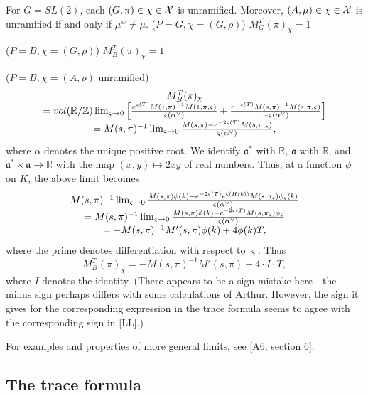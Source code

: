 \begin{example} For $G=SL(2)$, each $(G,\pi)\in\chi\in{\cal{X}}$ is
unramified. Moreover, $(A,\mu)\in\chi\in{\cal{X}}$ is unramified
if and only if $\mu^w\not=\mu$.
($P=G,\chi =(G,\rho )$) $M_G^T(\pi )_\chi =1$

($P=B,\chi =(G,\rho )$) $M_B^T(\pi )_\chi =1$

($P=B,\chi =(A,\rho )$ unramified) 
\[
\begin{array}{c}
M_B^T(\pi )_\chi \\
=vol({\mathbb{R}}/{\mathbb{Z}})
\lim_{\varsigma \rightarrow 0}
\left[
\frac{e^{\varsigma (T)}
M(1,\pi )^{-1}M(1,\pi ,\varsigma )}{\varsigma (\alpha^{\vee })}
+\frac{e^{-\varsigma (T)}
M(s,\pi )^{-1}M(s,\pi ,\varsigma )}{-\varsigma (\alpha^{\vee })}
\right]\\
=M(s,\pi)^{-1}
\lim_{\varsigma \rightarrow 0}
{M(s,\pi)-e^{-2\varsigma (T)}M(s,\pi,\varsigma)
\over \varsigma(\alpha^\vee)} ,
\end{array}
\]
where $\alpha $ denotes the unique positive root.
We identify ${\mathfrak{a}}^*$ with ${\mathbb{R}}$, ${\mathfrak{a}}$ with
${\mathbb{R}}$, and
${\mathfrak{a}}^*\times {\mathfrak{a}}\rightarrow {\mathbb{R}}$ with
the map $(x,y)\longmapsto 2xy$
of real numbers. Thus, at a function $\phi$
on $K$, the above limit becomes 
\[
\begin{array}{c}
M(s,\pi)^{-1}
\lim_{\varsigma \rightarrow 0}
{M(s,\pi)\phi(k)-e^{-2\varsigma (T)}e^{\varsigma (H(k))}
M(s,\pi_\varsigma)\phi_\varsigma(k)
\over \varsigma(\alpha^\vee)} \\
=M(s,\pi)^{-1}
\lim_{\varsigma \rightarrow 0}
{M(s,\pi)\phi(k)-e^{-2\varsigma (T)}M(s,\pi_\varsigma)\phi_\varsigma
\over \varsigma(\alpha^\vee)} \\
=-M(s,\pi)^{-1}M'(s,\pi)\phi(k)+4 \phi(k) T,
\end{array}
\]
where the prime denotes differentiation with respect to
$\varsigma$. Thus
\[
M_B^T(\pi )_\chi =
-M(s,\pi)^{-1}M'(s,\pi)+4\cdot I\cdot T,
\]
where $I$ denotes the identity. (There appears to be a sign
mistake here - the minus sign perhaps differs with some
calculations of Arthur. However, the sign it gives for the
corresponding expression in the trace formula
seems to agree with the corresponding sign in [LL].)

For
examples and properties of more general limits, see [A6, section 6].
\end{example}


\subsection{The trace formula}


